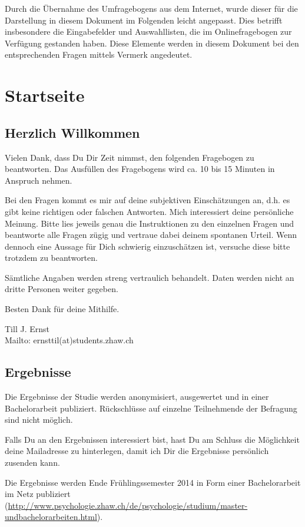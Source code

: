 \begin{RaggedRight}
Durch die Übernahme des Umfragebogens aus dem Internet, wurde dieser für die Darstellung in diesem Dokument im Folgenden leicht angepasst. Dies betrifft insbesondere die Eingabefelder und Auswahllisten, die im Onlinefragebogen zur Verfügung gestanden haben. Diese Elemente werden in diesem Dokument bei den entsprechenden Fragen mittels Vermerk angedeutet.
\section{Startseite}\label{anhangSesction.Startseite}
\subsection*{Herzlich Willkommen}
Vielen Dank, dass Du Dir Zeit nimmst, den folgenden Fragebogen zu beantworten. Das Ausfüllen des Fragebogens wird ca. 10 bis 15 Minuten in Anspruch nehmen.\par
Bei den Fragen kommt es mir auf deine subjektiven Einschätzungen an, d.h. es gibt keine richtigen oder falschen Antworten. Mich interessiert deine persönliche Meinung. Bitte lies jeweils genau die Instruktionen zu den einzelnen Fragen und beantworte alle Fragen zügig und vertraue dabei deinem spontanen Urteil. Wenn dennoch eine Aussage für Dich schwierig einzuschätzen ist, versuche diese bitte trotzdem zu beantworten. \par
Sämtliche Angaben werden streng vertraulich behandelt. Daten werden nicht an dritte Personen weiter gegeben. \par
Besten Dank für deine Mithilfe.\par
Till J. Ernst\\
Mailto: ernsttil(at)students.zhaw.ch
\subsection*{Ergebnisse}
Die Ergebnisse der Studie werden anonymisiert, ausgewertet und in einer Bachelorarbeit publiziert. Rückschlüsse auf einzelne Teilnehmende der Befragung sind nicht möglich.\par
Falls Du an den Ergebnissen interessiert bist, hast Du am Schluss die Möglichkeit deine Mailadresse zu hinterlegen, damit ich Dir die Ergebnisse persönlich zusenden kann. \par
Die Ergebnisse werden Ende Frühlingssemester 2014 in Form einer Bachelorarbeit im Netz publiziert (\url{http://www.psychologie.zhaw.ch/de/psychologie/studium/master-undbachelorarbeiten.html}).

\end{RaggedRight}
